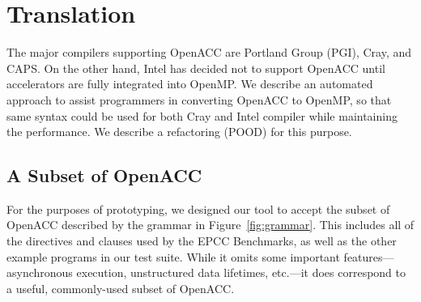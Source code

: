 \documentclass{sig-alternate-05-2015}
\begin{document}
\section{Translation}
\label{sec:translation}

The major compilers supporting OpenACC are Portland Group (PGI), Cray, and CAPS. On the other hand, Intel has decided not to support OpenACC until accelerators are fully integrated into OpenMP. We describe an automated approach to assist programmers in converting OpenACC to OpenMP, so that same syntax could be used for both Cray and Intel compiler while maintaining the performance. We describe a refactoring (POOD) for this purpose.

\subsection{A Subset of OpenACC}
For the purposes of prototyping, we designed our tool to accept the subset of
OpenACC described by the grammar in Figure~\ref{fig:grammar}.  This includes
all of the directives and clauses used by the EPCC Benchmarks, as well as the
other example programs in our test suite.  While it omits some important
features---asynchronous execution, unstructured data lifetimes, etc.---it does
correspond to a useful, commonly-used subset of OpenACC.
\end{document}
